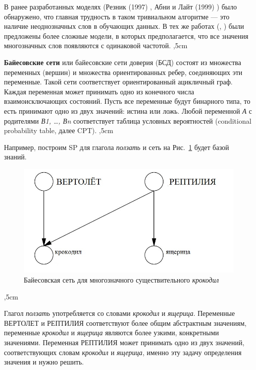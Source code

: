\documentclass{article}
\begin{document}
\begin{articletext}
В ранее разработанных моделях (Резник (1997) \cite{Resnik 1997}, Абни и Лайт (1999) \cite{Abney 1999}) было обнаружено, что главная трудность в таком тривиальном алгоритме --- это наличие неоднозначных слов в обучающих данных. В тех же работах (\cite{Resnik 1997}, \cite{Abney 1999}) были предложены более сложные модели, в которых предполагается, что все значения многозначных слов появляются с одинаковой частотой. 
,5cm

\textbf{Байесовские сети} или байесовские сети доверия (БСД) состоят из множества переменных (вершин) и множества ориентированных ребер, соединяющих эти переменные. Такой сети соответствует ориентированный ацикличный граф. Каждая переменная может принимать одно из конечного числа взаимоисключающих состояний. Пусть все переменные будут бинарного типа, то есть принимают одно из двух значений: истина или ложь. Любой переменной \textit{А} с родителями \textit{В1, …, Вn} соответствует таблица условных вероятностей (conditional probability table, далее CPT).
,5cm

Например, построим SP для глагола \textit{ползать} и сеть на Рис.~\ref{ris1} будет базой знаний.
\begin{figure}[H]
    \includegraphics[keepaspectratio=true,width=0.9\columnwidth]{bayesian_network_crocodile.jpg}
    \caption{Байесовская сеть для многозначного существительного \textit{крокодил}}
    \label{ris1}
\end{figure}
,5cm

Глагол \textit{ползать} употребляется со словами \textit{крокодил} и \textit{ящерица}. Переменные ВЕРТОЛЕТ и РЕПТИЛИЯ соответствуют более общим абстрактным значениям, переменные \textit{крокодил} и \textit{ящерица} являются более узкими, конкретными значениями. Переменная РЕПТИЛИЯ может принимать одно из двух значений, соответствующих словам \textit{крокодил} и \textit{ящерица}, именно эту задачу определения значения и нужно решить.


\end{articletext}
\end{document}
